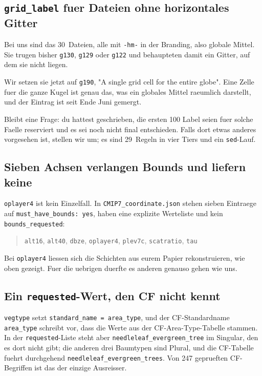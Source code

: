 \documentclass[11pt,a4paper]{article}
\newcommand{\code}[1]{\texttt{\small #1}}
\begin{document}
\subsection*{\code{grid\_label} fuer Dateien ohne horizontales Gitter}

Bei uns sind das 30~Dateien, alle mit \code{-hm-} in der Branding, also globale
Mittel. Sie trugen bisher \code{g130}, \code{g129} oder \code{g122} und behaupteten
damit ein Gitter, auf dem sie nicht liegen.

Wir setzen sie jetzt auf \code{g190}, "A single grid cell for the entire globe". Eine
Zelle fuer die ganze Kugel ist genau das, was ein globales Mittel raeumlich
darstellt, und der Eintrag ist seit Ende Juni gemergt.

Bleibt eine Frage: du hattest geschrieben, die ersten 100 Label seien fuer solche
Faelle reserviert und es sei noch nicht final entschieden. Falls dort etwas anderes
vorgesehen ist, stellen wir um; es sind 29~Regeln in vier Tiers und ein
\code{sed}-Lauf.

\subsection*{Sieben Achsen verlangen Bounds und liefern keine}

\code{oplayer4} ist kein Einzelfall. In \code{CMIP7\_coordinate.json} stehen sieben
Eintraege auf \code{must\_have\_bounds: yes}, haben eine explizite Werteliste und kein
\code{bounds\_requested}:

\begin{quote}
\code{alt16}, \code{alt40}, \code{dbze}, \code{oplayer4}, \code{plev7c},
\code{scatratio}, \code{tau}
\end{quote}

Bei \code{oplayer4} liessen sich die Schichten aus eurem Papier rekonstruieren, wie
oben gezeigt. Fuer die uebrigen duerfte es anderen genauso gehen wie uns.

\subsection*{Ein \code{requested}-Wert, den CF nicht kennt}

\code{vegtype} setzt \code{standard\_name = area\_type}, und der CF-Standardname
\code{area\_type} schreibt vor, dass die Werte aus der CF-Area-Type-Tabelle stammen.
In der \code{requested}-Liste steht aber \code{needleleaf\_evergreen\_tree} im
Singular, den es dort nicht gibt; die anderen drei Baumtypen sind Plural, und die
CF-Tabelle fuehrt durchgehend \code{needleleaf\_evergreen\_trees}. Von 247 geprueften
CF-Begriffen ist das der einzige Ausreisser.
\end{document}
